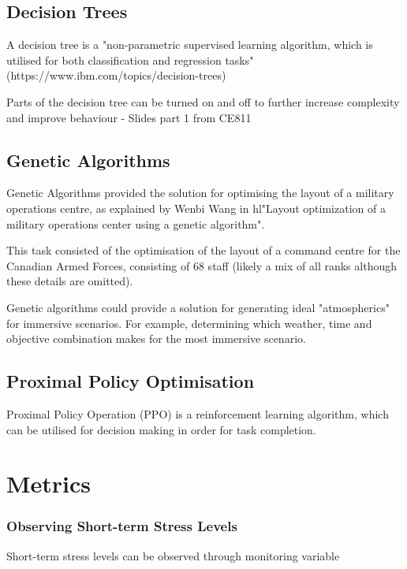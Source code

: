 \documentclass{article}
\begin{document}
\subsection{Decision Trees}

A decision tree is a "non-parametric supervised learning algorithm, which is utilised for both classification and regression tasks" (https://www.ibm.com/topics/decision-trees)

Parts of the decision tree can be turned on and off to further increase complexity and improve behaviour - Slides part 1 from CE811

\subsection{Genetic Algorithms}

Genetic Algorithms provided the solution for optimising the layout of a military operations centre, as explained by Wenbi Wang in hl{"Layout optimization of a military operations center using a genetic algorithm".}

This task consisted of the optimisation of the layout of a command centre for the Canadian Armed Forces, consisting of 68 staff (likely a mix of all ranks although these details are omitted).

Genetic algorithms could provide a solution for generating ideal "atmospherics" for immersive scenarios. For example, determining which weather, time and objective combination makes for the most immersive scenario.  

\subsection{Proximal Policy Optimisation}

Proximal Policy Operation (PPO) is a reinforcement learning algorithm, which can be utilised for decision making in order for task completion. \cite{schulman2017proximal}

\section{Metrics}

\subsubsection{Observing Short-term Stress Levels}

Short-term stress levels can be observed through monitoring variable 
\end{document}
